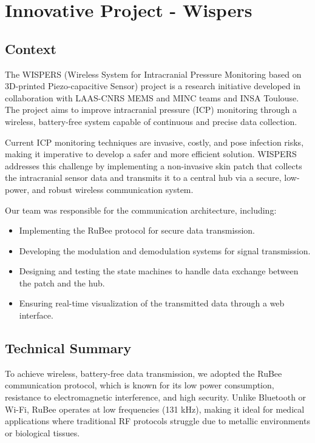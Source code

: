 \section{Innovative Project - Wispers}

\subsection{Context}
\indent \indent The WISPERS (Wireless System for Intracranial Pressure Monitoring based on 3D-printed Piezo-capacitive Sensor) project is a research initiative developed in collaboration with LAAS-CNRS MEMS and MINC teams and INSA Toulouse. The project aims to improve intracranial pressure (ICP) monitoring through a wireless, battery-free system capable of continuous and precise data collection.
\vspace{0.25cm}

\noindent Current ICP monitoring techniques are invasive, costly, and pose infection risks, making it imperative to develop a safer and more efficient solution. WISPERS addresses this challenge by implementing a non-invasive skin patch that collects the intracranial sensor data and transmits it to a central hub via a secure, low-power, and robust wireless communication system.
\vspace{0.25cm}

\noindent Our team was responsible for the communication architecture, including:

\begin{itemize}
\item Implementing the RuBee protocol for secure data transmission.
\item Developing the modulation and demodulation systems for signal transmission.
\item Designing and testing the state machines to handle data exchange between the patch and the hub.
\item Ensuring real-time visualization of the transmitted data through a web interface.
\end{itemize}

\subsection{Technical Summary}
\indent \indent To achieve wireless, battery-free data transmission, we adopted the RuBee communication protocol, which is known for its low power consumption, resistance to electromagnetic interference, and high security. Unlike Bluetooth or Wi-Fi, RuBee operates at low frequencies (131 kHz), making it ideal for medical applications where traditional RF protocols struggle due to metallic environments or biological tissues.

